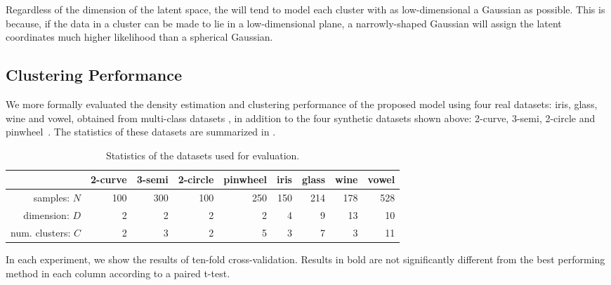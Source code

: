 Regardless of the dimension of the latent space, the \iwmm{} will tend to model each cluster with as low-dimensional a Gaussian as possible. 
This is because, if the data in a cluster can be made to lie in a low-dimensional plane, a narrowly-shaped Gaussian will assign the latent coordinates much higher likelihood than a spherical Gaussian.

\subsection{Clustering Performance}
We more formally evaluated the density estimation and clustering performance of the proposed model using four real datasets: iris, glass, wine and vowel, obtained from \LIBSVM{} multi-class datasets \citep{chang2011libsvm}, in addition to the four synthetic datasets shown above: 2-curve, 3-semi, 2-circle and pinwheel~\citep{adams2009archipelago}.
The statistics of these datasets are summarized in .
%
\begin{table}[ht!]
\centering
\caption[Datasets used for evaluation of the \siwmm{}]
{Statistics of the datasets used for evaluation.}
\label{tab:statistics}
\begin{tabular}{rrrrrrrrr}
\hline
 & 2-curve & 3-semi & 2-circle & pinwheel & iris & glass  & wine  & vowel  \\
\hline
samples: $N$ & 100 & 300 & 100 & 250 & 150 & 214 & 178 & 528 \\
dimension: $D$ & 2 & 2 & 2 & 2 & 4 & 9 & 13 & 10 \\
num. clusters: $C$ & 2 & 3 & 2 & 5 & 3 & 7 & 3 & 11 \\
\hline
\end{tabular}
\end{table}
%
In each experiment, we show the results of ten-fold cross-validation.
Results in bold are not significantly different from the best performing method in each column according to a paired t-test.
%
%

